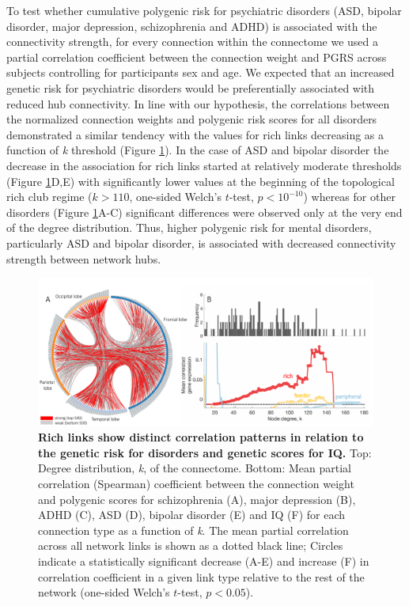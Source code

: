 To test whether cumulative polygenic risk for psychiatric disorders (ASD, bipolar disorder, major depression, schizophrenia and ADHD) is associated with the connectivity strength, for every connection within the connectome we used a partial correlation coefficient between the connection weight and PGRS across subjects controlling for participants sex and age. We expected that an increased genetic risk for psychiatric disorders would be preferentially associated with reduced hub connectivity. In line with our hypothesis, the correlations between the normalized connection weights and polygenic risk scores for all disorders demonstrated a similar tendency with the values for rich links decreasing as a function of \textit{k} threshold (Figure \ref{fig:Ch5Fig5}). In the case of ASD and bipolar disorder the decrease in the association for rich links started at relatively moderate thresholds (Figure \ref{fig:Ch5Fig5}D,E) with significantly lower values at the beginning of the topological rich club regime ($k>110$, one-sided Welch's $t$-test, $p < 10^{-10}$) whereas for other disorders (Figure \ref{fig:Ch5Fig5}A-C) significant differences were observed only at the very end of the degree distribution. Thus, higher polygenic risk for mental disorders, particularly ASD and bipolar disorder, is associated with decreased connectivity strength between network hubs.

\begin{figure}[h!]
\begin{center}
\includegraphics[width=1\textwidth]{Chapter5/Ch5Fig5.pdf}%
\end{center}
\caption{\textbf{Rich links show distinct correlation patterns in relation to the genetic risk for disorders and genetic scores for IQ.}
Top: Degree distribution, \textit{k}, of the connectome. Bottom: Mean partial correlation (Spearman) coefficient between the connection weight and polygenic scores for schizophrenia (A), major depression (B), ADHD (C), ASD (D), bipolar disorder (E) and IQ (F) for each connection type as a function of \textit{k}. The mean partial correlation across all network links is shown as a dotted black line; Circles indicate a statistically significant decrease (A-E) and increase (F) in correlation coefficient in a given link type relative to the rest of the network (one-sided Welch's $t$-test, $p < 0.05$).}
\label{fig:Ch5Fig5}
\end{figure}

